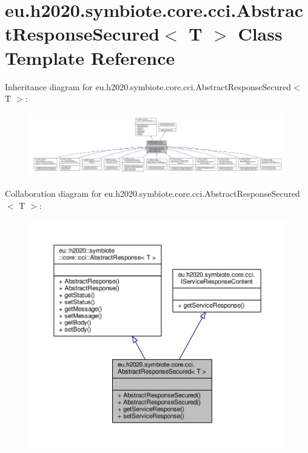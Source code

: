 \hypertarget{classeu_1_1h2020_1_1symbiote_1_1core_1_1cci_1_1AbstractResponseSecured}{}\section{eu.\+h2020.\+symbiote.\+core.\+cci.\+Abstract\+Response\+Secured$<$ T $>$ Class Template Reference}
\label{classeu_1_1h2020_1_1symbiote_1_1core_1_1cci_1_1AbstractResponseSecured}


Inheritance diagram for eu.\+h2020.\+symbiote.\+core.\+cci.\+Abstract\+Response\+Secured$<$ T $>$\+:\nopagebreak
\begin{figure}[H]
\begin{center}
\leavevmode
\includegraphics[width=350pt]{classeu_1_1h2020_1_1symbiote_1_1core_1_1cci_1_1AbstractResponseSecured__inherit__graph}
\end{center}
\end{figure}


Collaboration diagram for eu.\+h2020.\+symbiote.\+core.\+cci.\+Abstract\+Response\+Secured$<$ T $>$\+:\nopagebreak
\begin{figure}[H]
\begin{center}
\leavevmode
\includegraphics[width=350pt]{classeu_1_1h2020_1_1symbiote_1_1core_1_1cci_1_1AbstractResponseSecured__coll__graph}
\end{center}
\end{figure}
